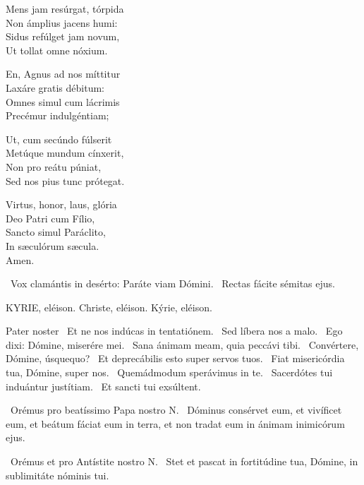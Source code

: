 Mens jam resúrgat, tórpida\\
Non ámplius jacens humi:\\
Sidus refúlget jam novum,\\
Ut tollat omne nóxium.

En, Agnus ad nos míttitur\\
Laxáre gratis débitum:\\
Omnes simul cum lácrimis\\
Precémur indulgéntiam;

Ut, cum secúndo fúlserit\\
Metúque mundum cínxerit,\\
Non pro reátu púniat,\\
Sed nos pius tunc prótegat.

Virtus, honor, laus, glória\\
Deo Patri cum Fílio,\\
Sancto simul Paráclito,\\
In sæculórum sæcula.\\
Amen.

\V\ Vox clamántis in desérto: Paráte viam Dómini. \R\ Rectas fácite sémitas ejus.



\label{feria6:precesferiales}

KYRIE, eléison. Christe, eléison. Kýrie, eléison.

Pater noster  \V\ Et ne nos indúcas in tentatiónem. \R\ Sed líbera nos a malo. \V\ Ego dixi: Dómine, miserére mei. \R\ Sana ánimam meam, quia peccávi tibi. \V\ Convértere, Dómine, úsquequo? \R\ Et deprecábilis esto super servos tuos. \V\ Fiat misericórdia tua, Dómine, super nos. \R\ Quemádmodum sperávimus in te. \V\ Sacerdótes tui induántur justítiam. \R\ Et sancti tui exsúltent.

\V\ Orémus pro beatíssimo Papa nostro N. \R\ Dóminus consérvet eum, et vivíficet eum, et beátum fáciat eum in terra, et non tradat eum in ánimam inimicórum ejus.

\V\ Orémus et pro Antístite nostro N. \R\ Stet et pascat in fortitúdine tua, Dómine, in sublimitáte nóminis tui.

